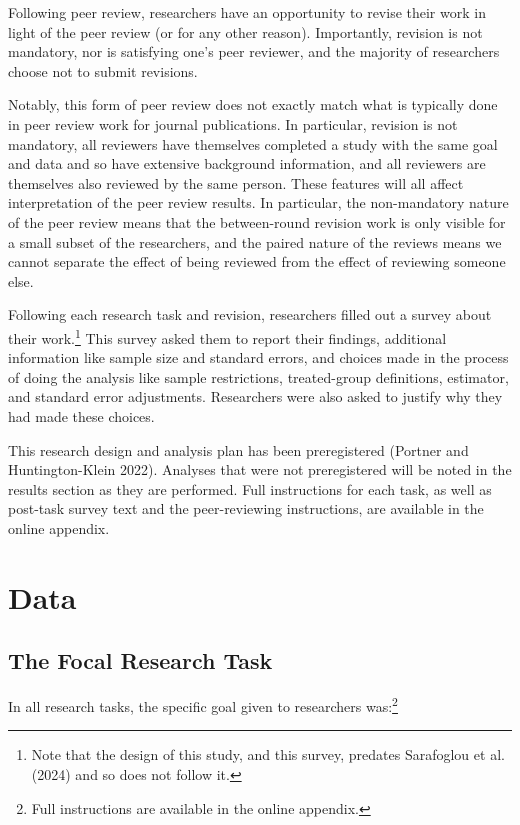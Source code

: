 \documentclass[
  letterpaper,
  DIV=11,
  numbers=noendperiod]{scrartcl}
\begin{document}
Following peer review, researchers have an opportunity to revise their
work in light of the peer review (or for any other reason). Importantly,
revision is not mandatory, nor is satisfying one's peer reviewer, and
the majority of researchers choose not to submit revisions.

Notably, this form of peer review does not exactly match what is
typically done in peer review work for journal publications. In
particular, revision is not mandatory, all reviewers have themselves
completed a study with the same goal and data and so have extensive
background information, and all reviewers are themselves also reviewed
by the same person. These features will all affect interpretation of the
peer review results. In particular, the non-mandatory nature of the peer
review means that the between-round revision work is only visible for a
small subset of the researchers, and the paired nature of the reviews
means we cannot separate the effect of being reviewed from the effect of
reviewing someone else.

Following each research task and revision, researchers filled out a
survey about their work.\footnote{Note that the design of this study,
  and this survey, predates Sarafoglou et al. (2024) and so does not
  follow it.} This survey asked them to report their findings,
additional information like sample size and standard errors, and choices
made in the process of doing the analysis like sample restrictions,
treated-group definitions, estimator, and standard error adjustments.
Researchers were also asked to justify why they had made these choices.

This research design and analysis plan has been preregistered (Portner
and Huntington-Klein 2022). Analyses that were not preregistered will be
noted in the results section as they are performed. Full instructions
for each task, as well as post-task survey text and the peer-reviewing
instructions, are available in the online appendix.

\section{Data}\label{data}

\subsection{The Focal Research Task}\label{sec-focaltask}

In all research tasks, the specific goal given to researchers
was:\footnote{Full instructions are available in the online appendix.}
\end{document}
